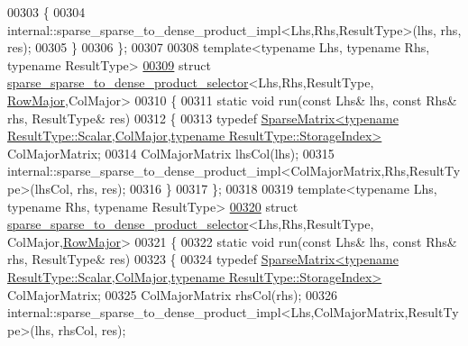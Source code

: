 \begin{DoxyCode}
00303   \{
00304     internal::sparse\_sparse\_to\_dense\_product\_impl<Lhs,Rhs,ResultType>(lhs, rhs, res);
00305   \}
00306 \};
00307 
00308 \textcolor{keyword}{template}<\textcolor{keyword}{typename} Lhs, \textcolor{keyword}{typename} Rhs, \textcolor{keyword}{typename} ResultType>
\hyperlink{struct_eigen_1_1internal_1_1sparse__sparse__to__dense__product__selector_3_01_lhs_00_01_rhs_00_08b233438bc6784cbf4bc720db2f0656b}{00309} \textcolor{keyword}{struct }\hyperlink{struct_eigen_1_1internal_1_1sparse__sparse__to__dense__product__selector}{sparse\_sparse\_to\_dense\_product\_selector}<Lhs,Rhs,ResultType,
      \hyperlink{group__enums_ggaacded1a18ae58b0f554751f6cdf9eb13acfcde9cd8677c5f7caf6bd603666aae3}{RowMajor},ColMajor>
00310 \{
00311   \textcolor{keyword}{static} \textcolor{keywordtype}{void} run(\textcolor{keyword}{const} Lhs& lhs, \textcolor{keyword}{const} Rhs& rhs, ResultType& res)
00312   \{
00313     \textcolor{keyword}{typedef} 
      \hyperlink{group___sparse_core___module_class_eigen_1_1_sparse_matrix}{SparseMatrix<typename ResultType::Scalar,ColMajor,typename ResultType::StorageIndex>}
       ColMajorMatrix;
00314     ColMajorMatrix lhsCol(lhs);
00315     internal::sparse\_sparse\_to\_dense\_product\_impl<ColMajorMatrix,Rhs,ResultType>(lhsCol, rhs, res);
00316   \}
00317 \};
00318 
00319 \textcolor{keyword}{template}<\textcolor{keyword}{typename} Lhs, \textcolor{keyword}{typename} Rhs, \textcolor{keyword}{typename} ResultType>
\hyperlink{struct_eigen_1_1internal_1_1sparse__sparse__to__dense__product__selector_3_01_lhs_00_01_rhs_00_03ba5c23d41a3f74ec97ddc300014b4ee}{00320} \textcolor{keyword}{struct }\hyperlink{struct_eigen_1_1internal_1_1sparse__sparse__to__dense__product__selector}{sparse\_sparse\_to\_dense\_product\_selector}<Lhs,Rhs,ResultType,
      ColMajor,\hyperlink{group__enums_ggaacded1a18ae58b0f554751f6cdf9eb13acfcde9cd8677c5f7caf6bd603666aae3}{RowMajor}>
00321 \{
00322   \textcolor{keyword}{static} \textcolor{keywordtype}{void} run(\textcolor{keyword}{const} Lhs& lhs, \textcolor{keyword}{const} Rhs& rhs, ResultType& res)
00323   \{
00324     \textcolor{keyword}{typedef} 
      \hyperlink{group___sparse_core___module_class_eigen_1_1_sparse_matrix}{SparseMatrix<typename ResultType::Scalar,ColMajor,typename ResultType::StorageIndex>}
       ColMajorMatrix;
00325     ColMajorMatrix rhsCol(rhs);
00326     internal::sparse\_sparse\_to\_dense\_product\_impl<Lhs,ColMajorMatrix,ResultType>(lhs, rhsCol, res);

\end{DoxyCode}
